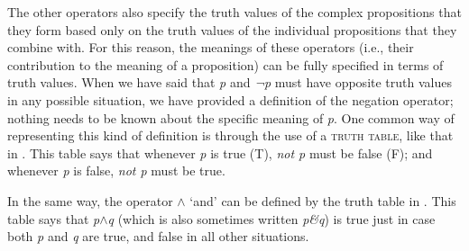 The other operators also specify the truth values of the complex propositions that they form based only on the truth values of the individual propositions that they combine with. For this reason, the meanings of these operators (i.e., their contribution to the meaning of a proposition) can be fully specified in terms of truth values. When we have said that \textit{p} and \textit{¬p} must have opposite truth values in any possible situation, we have provided a definition of the negation operator; nothing needs to be known about the specific meaning of \textit{p}. One common way of representing this kind of definition is through the use of a \textsc{truth table}, like that in . This table says that whenever \textit{p} is true (T), \textit{not p} must be false (F); and whenever \textit{p} is false, \textit{not p} must be true.



In the same way, the operator \textit{$\wedge$} ‘and’ can be defined by the truth table in . This table says that \textit{p$\wedge$}\textit{q} (which is also sometimes written \textit{p\&}\textit{q}) is true just in case both \textit{p} and \textit{q} are true, and false in all other situations.



